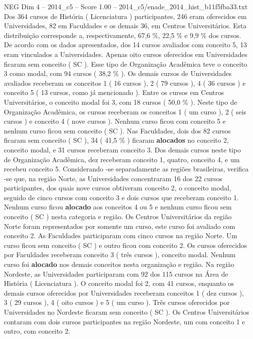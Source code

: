 \begin{textsample}{NEG Dim 4 – 2014\_c5 – Score 1.00 – 2014\_c5/enade\_2014\_hist\_b11f5fba33.txt}
Dos 364 cursos de História ( Licenciatura ) participantes, 246 eram oferecidos em Universidades, 82 em Faculdades e os demais 36, em Centros Universitários.
Esta distribuição corresponde a, respectivamente, 67,6 \%, 22,5 \% e 9,9 \% dos cursos.
De acordo com os dados apresentados, dos 14 cursos avaliados com conceito 5, 13 eram vinculados a Universidades.
Apenas oito cursos oferecidos em Universidades ficaram sem conceito ( SC ).
Esse tipo de Organização Acadêmica teve o conceito 3 como modal, com 94 cursos ( 38,2 \% ).
Os demais cursos de Universidades avaliados receberam os conceitos 1 ( 16 cursos ), 2 ( 79 cursos ), 4 ( 36 cursos ) e conceito 5 ( 13 cursos, como já mencionado ).
Entre os cursos em Centros Universitários, o conceito modal foi 3, com 18 cursos ( 50,0 \% ).
Neste tipo de Organização Acadêmica, os cursos receberam os conceitos 1 ( um curso ), 2 ( seis cursos ) e conceito 4 ( nove cursos ).
Nenhum curso ficou com conceito 5 e nenhum curso ficou sem conceito ( SC ).
Nas Faculdades, dois dos 82 cursos ficaram sem conceito ( SC ), 34 ( 41,5 \% ) ficaram \textbf{alocados} no conceito 2, conceito modal, e 31 cursos receberam conceito 3.
Dos demais cursos neste tipo de Organização Acadêmica, dez receberam conceito 1, quatro, conceito 4, e um recebeu conceito 5.
Considerando -se separadamente as regiões brasileiras, verifica -se que, na região Norte, as Universidades concentraram 16 dos 22 cursos participantes, dos quais nove cursos obtiveram conceito 2, o conceito modal, seguido de cinco cursos com conceito 3 e dois cursos que receberam conceito 1.
Nenhum curso ficou \textbf{alocado} aos conceitos 4 ou 5 e nenhum curso ficou sem conceito ( SC ) nesta categoria e região.
Os Centros Universitários da região Norte foram representados por somente um curso, este curso foi avaliado com conceito 2.
As Faculdades participaram com cinco cursos na região Norte.
Um curso ficou sem conceito ( SC ) e outro ficou com conceito 2.
Os cursos oferecidos por Faculdades receberam conceito 3 ( três cursos ), conceito modal.
Nenhum curso foi \textbf{alocado} nos demais conceitos nesta organização e região.
Na região Nordeste, as Universidades participaram com 92 dos 115 cursos na Área de História ( Licenciatura ).
O conceito modal foi 2, com 41 cursos, enquanto os demais cursos oferecidos por Universidades receberam conceitos 1 ( dez cursos ), 3 ( 29 cursos ), 4 ( oito cursos ) e 5 ( um curso ).
Três cursos oferecidos por Universidades no Nordeste ficaram sem conceito ( SC ).
Os Centros Universitários contaram com dois cursos participantes na região Nordeste, um com conceito 1 e outro, com conceito 2.

\end{textsample}
